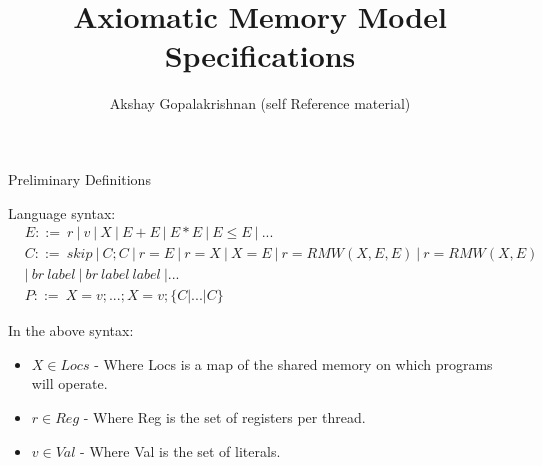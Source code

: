 \documentclass[xcolor={dvipsnames}, notes]{beamer}
\title{Axiomatic Memory Model Specifications}
\author{Akshay Gopalakrishnan (self Reference material)}
\begin{document}
    \begin{frame}
        \maketitle
    \end{frame}
  


    \begin{frame}{Preliminary Definitions}
        
        Language syntax: 
        \begin{align*}
            & E ::= \ r \ | \ v \ | \ X \ | \ E+E \ | \ E*E \ | \ E\leq E \ | \ ... \\
            & C ::= \ skip \ | \ C;C \ | \ r=E \ | \ r=X \ | \ X=E \ | \ r=RMW(X,E,E) \ | \ r=RMW(X,E) \\
            & | \ br \ label \ | \ br \ label \ label \ |... \\
            & P ::= \ X=v;...;X=v;\{C|...|C\}
        \end{align*}

        In the above syntax:
        \begin{itemize}
            \item $X \in Locs$ - Where Locs is a map of the shared memory on which programs will operate.
            \item $r \in Reg$ - Where Reg is the set of registers per thread.
            \item $v \in Val$ - Where Val is the set of literals. 
        \end{itemize}

    \end{frame}
\end{document}
